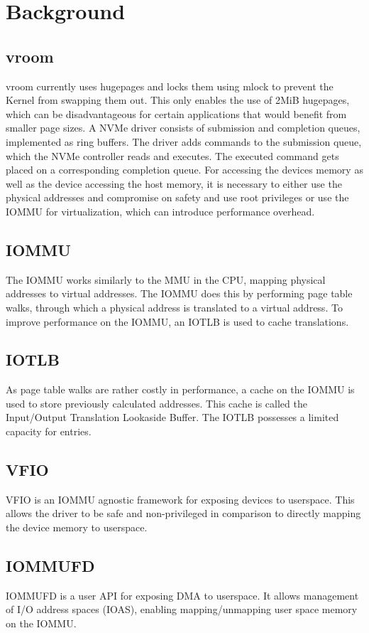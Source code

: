 \chapter{Background}

\section{vroom}
vroom currently uses hugepages and locks them using mlock to prevent the Kernel from swapping them out. 
This only enables the use of 2MiB hugepages, which can be disadvantageous for certain applications that would benefit from smaller page sizes.
A NVMe driver consists of submission and completion queues, implemented as ring buffers. 
The driver adds commands to the submission queue, which the NVMe controller reads and executes. 
The executed command gets placed on a corresponding completion queue.
For accessing the devices memory as well as the device accessing the host memory, it is necessary to either use the physical addresses and compromise on safety and use root privileges or use the IOMMU for virtualization, which can introduce performance overhead. 

\section{IOMMU}
The IOMMU works similarly to the MMU in the CPU, mapping physical addresses to virtual addresses.
The IOMMU does this by performing page table walks, through which a physical address is translated to a virtual address.
To improve performance on the IOMMU, an IOTLB is used to cache translations.

\section{IOTLB}
As page table walks are rather costly in performance, a cache on the IOMMU is used to store previously calculated addresses. This cache is called the Input/Output Translation Lookaside Buffer. The IOTLB possesses a limited capacity for entries. 

\section{VFIO}
VFIO is an IOMMU agnostic framework for exposing devices to userspace. 
This allows the driver to be safe and non-privileged in comparison to directly mapping the device memory to userspace. 

\section{IOMMUFD}
IOMMUFD is a user API for exposing DMA to userspace. 
It allows management of I/O address spaces (IOAS), enabling mapping/unmapping user space memory on the IOMMU.
